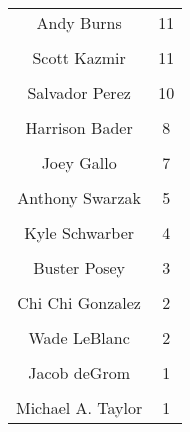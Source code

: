 \begin{table}
\begin{tabular}[t]{|>{}c|>{}c|}
\hline
\cellcolor{gray!6}{Zack Godley} & \cellcolor{gray!6}{13}\\
\hline
Andy Burns & 11\\
\hline
\cellcolor{gray!6}{Bryce Harper} & \cellcolor{gray!6}{11}\\
\hline
Scott Kazmir & 11\\
\hline
\cellcolor{gray!6}{Byron Buxton} & \cellcolor{gray!6}{10}\\
\hline
Salvador Perez & 10\\
\hline
\cellcolor{gray!6}{AJ Ramos} & \cellcolor{gray!6}{8}\\
\hline
Harrison Bader & 8\\
\hline
\cellcolor{gray!6}{Jack Flaherty} & \cellcolor{gray!6}{8}\\
\hline
Joey Gallo & 7\\
\hline
\cellcolor{gray!6}{AJ Pollock} & \cellcolor{gray!6}{5}\\
\hline
Anthony Swarzak & 5\\
\hline
\cellcolor{gray!6}{Jorge Polanco} & \cellcolor{gray!6}{5}\\
\hline
Kyle Schwarber & 4\\
\hline
\cellcolor{gray!6}{Starling Marte} & \cellcolor{gray!6}{4}\\
\hline
Buster Posey & 3\\
\hline
\cellcolor{gray!6}{Teoscar Hernandez} & \cellcolor{gray!6}{3}\\
\hline
Chi Chi Gonzalez & 2\\
\hline
\cellcolor{gray!6}{Jeimer Candelario} & \cellcolor{gray!6}{2}\\
\hline
Wade LeBlanc & 2\\
\hline
\cellcolor{gray!6}{Hanser Alberto} & \cellcolor{gray!6}{1}\\
\hline
Jacob deGrom & 1\\
\hline
\cellcolor{gray!6}{Luis Robert} & \cellcolor{gray!6}{1}\\
\hline
Michael A. Taylor & 1\\
\hline
\end{tabular}
\end{table}

